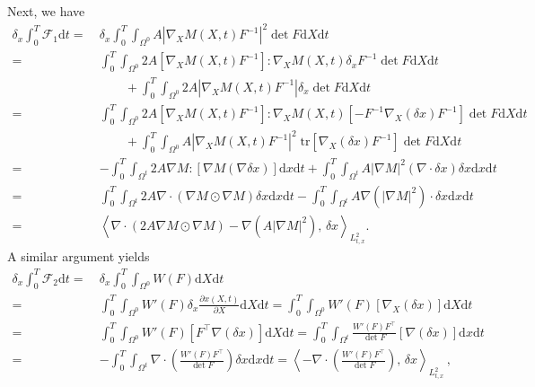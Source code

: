 \documentclass[reqno,11pt]{amsart}
\numberwithin{equation}{section}
\def\p{\partial}
\def\d{\mathrm{d}}
\def\no{\nonumber}
\def\tr{\mathrm{tr}}
\newcommand{\skpa}[2]{\left\langle #1,\, #2 \right\rangle}
\begin{document}
Next, we have
  \begin{align}\label{eq:F1-vari-x}
    \delta_x \int_0^T \mathcal{F}_1 \d t 
    =\ & \delta_x \int_0^T \int_{\Omega^0} A|\nabla_X M(X,t) F^{-1}|^2 \det F \d X \d t \\\no
    =\ & \int_0^T \int_{\Omega^0} 2 A \left[ \nabla_X M(X,t) F^{-1} \right] : \nabla_X M(X,t) \delta_x F^{-1} \det F \d X \d t 
          \\[3pt] \no & \qquad 
          + \int_0^T \int_{\Omega^0} 2 A |\nabla_X M(X,t) F^{-1}| \delta_x \det F \d X \d t \\\no
    =\ & \int_0^T \int_{\Omega^0} 2 A \left[ \nabla_X M(X,t) F^{-1} \right] : \nabla_X M(X,t) \left[ - F^{-1} \nabla_X (\delta x) F^{-1} \right] \det F \d X \d t 
          \\[3pt] \no & \qquad 
          + \int_0^T \int_{\Omega^0} A |\nabla_X M(X,t) F^{-1}|^2 \;\tr \left[ \nabla_X (\delta x) F^{-1} \right] \det F \d X \d t \\\no
    =\ & -\int_0^T \int_{\Omega^t} 2 A \nabla M : [\nabla M (\nabla \delta x)] \d x \d t 
          + \int_0^T \int_{\Omega^t} A |\nabla M|^2 (\nabla \cdot \delta x) \delta x \d x \d t \\\no
    =\ & \int_0^T \int_{\Omega^t} 2 A \nabla \cdot (\nabla M \odot \nabla M) \delta x \d x \d t 
          - \int_0^T \int_{\Omega^t} A \nabla (|\nabla M|^2) \cdot \delta x \d x \d t \\\no
    =\ & \skpa{\nabla \cdot (2 A \nabla M \odot \nabla M) - \nabla (A |\nabla M|^2)}{\delta x}_{L^2_{t,x}}.
  \end{align}
A similar argument yields
  \begin{align}\label{eq:F2-vari-x}
    \delta_x \int_0^T \mathcal{F}_2 \d t 
    =\ & \delta_x \int_0^T \int_{\Omega^0} W(F) \d X \d t \\\no
    =\ & \int_0^T \int_{\Omega^0} W'(F) \delta_x \frac{\p x(X,t)}{\p X} \d X \d t %
    = \int_0^T \int_{\Omega^0} W'(F) \left[ \nabla_X (\delta x) \right] \d X \d t  \\\no
    =\ & \int_0^T \int_{\Omega^0} W'(F) \left[ F^\top \nabla (\delta x) \right] \d X \d t  %
    = \int_0^T \int_{\Omega^t} \frac{W'(F)F^\top}{\det F} \left[ \nabla (\delta x) \right] \d x \d t  \\\no
    =\ & -\int_0^T \int_{\Omega^t} \nabla \cdot \left( \frac{W'(F)F^\top}{\det F} \right) \delta x \d x \d t = \skpa{-\nabla \cdot \left( \frac{W'(F)F^\top}{\det F} \right) }{\delta x}_{L^2_{t,x}} \,, 
  \end{align}
\end{document}
